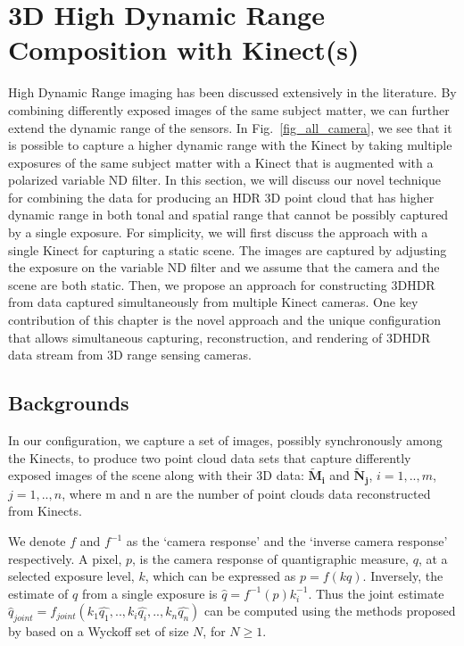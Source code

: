 \section{3D High Dynamic Range Composition with Kinect(s)} 
High Dynamic Range imaging has been discussed extensively in the literature. By combining differently exposed images of the same subject matter, we can further extend the dynamic range of the sensors. In Fig.~\ref{fig_all_camera}, we see that it is possible to capture a higher dynamic range with the Kinect by taking multiple exposures of the same subject matter with a Kinect that is augmented with a polarized variable ND filter. In this section, we will discuss our novel technique for combining the data for producing an HDR 3D point cloud that has higher dynamic range in both tonal and spatial range that cannot be possibly captured by a single exposure. For simplicity, we will first discuss the approach with a single Kinect for capturing a static scene. The images are captured by adjusting the exposure on the variable ND filter and we assume that the camera and the scene are both static. Then, we propose an approach for constructing 3DHDR from data captured simultaneously from multiple Kinect cameras. One key contribution of this chapter is the novel approach and the unique configuration that allows simultaneous capturing, reconstruction, and rendering of 3DHDR data stream from 3D range sensing cameras. 

\subsection{Backgrounds}
In our configuration, we capture a set of images, possibly synchronously among the Kinects, to produce two point cloud data sets that capture differently exposed images of the scene along with their 3D data: $\mathbf{\tilde{M}_{i}}$ and $\mathbf{\tilde{N}_{j}}$, $i=1,..,m$, $j=1,..,n$, where m and n are the number of point clouds data reconstructed from Kinects.

We denote $f$ and $f^{-1}$ as the `camera response' and the `inverse camera response' respectively. A pixel, $p$, is the camera response of quantigraphic measure, $q$, at a selected exposure level, $k$, which can be expressed as $p = f(kq)$. Inversely, the estimate of $q$ from a single exposure is $\hat{q} = f^{-1}(p)k_i^{-1}$. Thus the joint estimate $\hat{q}_{joint} = f_{joint}(k_1\hat{q_1}, .., k_i\hat{q_i}, .., k_n\hat{q_n})$ can be computed using the methods proposed by \cite{mannist,robertson2003estimation,ali2012ICASSP} based on a Wyckoff set \cite{wyckoff1962experimental} of size $N$, for $N \ge 1$.

